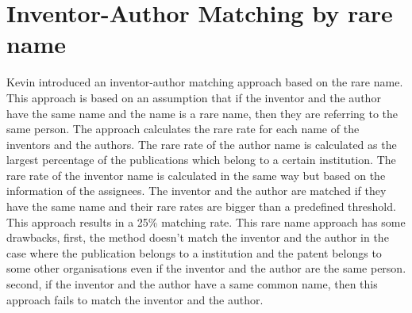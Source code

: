 \section{Inventor-Author Matching by rare name}
Kevin introduced an inventor-author matching approach based on the rare name. This approach is based on an assumption that if the inventor and the author have the same name and the name is a rare name, then they are referring to the same person. The approach calculates the rare rate for each name of the inventors and the authors. The rare rate of the author name is calculated as the largest percentage of the publications which belong to a certain institution. The rare rate of the inventor name is calculated in the same way but based on the information of the assignees. The inventor and the author are matched if they have the same name and their rare rates are bigger than a predefined threshold. This approach results in a 25\% matching rate. This rare name approach has some drawbacks, first, the method doesn't match the inventor and the author in the case where the publication belongs to a institution and the patent belongs to some other organisations even if the inventor and the author are the same person. second, if the inventor and the author have a same common name, then this approach fails to match the inventor and the author.

